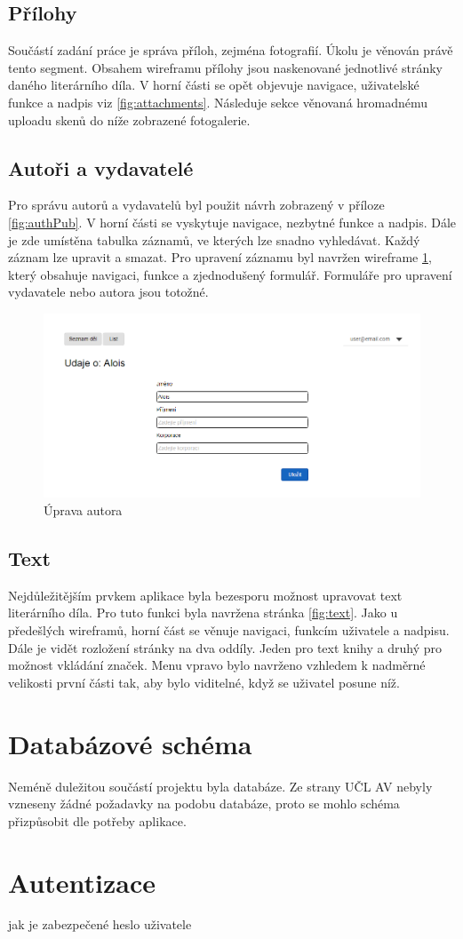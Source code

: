         \subsection{Přílohy}
            Součástí zadání práce je správa příloh, zejména fotografií. Úkolu je věnován právě tento segment. Obsahem wireframu přílohy jsou naskenované jednotlivé stránky daného literárního díla. V horní části se opět objevuje navigace, uživatelské funkce a nadpis viz \ref{fig:attachments}. Následuje sekce věnovaná hromadnému uploadu skenů do níže zobrazené fotogalerie.
            
        \subsection{Autoři a vydavatelé}
            Pro správu autorů a vydavatelů byl použit návrh zobrazený v příloze \ref{fig:authPub}. V horní části se vyskytuje navigace, nezbytné funkce a nadpis. Dále je zde umístěna tabulka záznamů, ve kterých lze snadno vyhledávat. Každý záznam lze upravit a smazat. Pro upravení záznamu byl navržen wireframe \ref{fig:edit}, který obsahuje navigaci, funkce a zjednodušený formulář. Formuláře pro upravení vydavatele nebo autora jsou totožné.
            
            \begin {figure}[H]\centering
                \includegraphics[width=\textwidth]{images/edit}
                \caption {Úprava autora}
                \label {fig:edit}
            \end{figure}
            
        \subsection{Text}
            Nejdůležitějším prvkem aplikace byla bezesporu možnost upravovat text literárního díla. Pro tuto funkci byla navržena stránka \ref{fig:text}. Jako u předešlých wireframů, horní část se věnuje navigaci, funkcím uživatele a nadpisu. Dále je vidět rozložení stránky na dva oddíly. Jeden pro text knihy a druhý pro možnost vkládání značek. Menu vpravo bylo navrženo vzhledem k nadměrné velikosti první části tak, aby bylo viditelné, když se uživatel posune níž.
            
    \section{Databázové schéma}
        Neméně duležitou součástí projektu byla databáze. Ze strany UČL AV nebyly vzneseny žádné požadavky na podobu databáze, proto se mohlo schéma přizpůsobit dle potřeby aplikace.
        
    \section{Autentizace}
        jak je zabezpečené heslo uživatele
